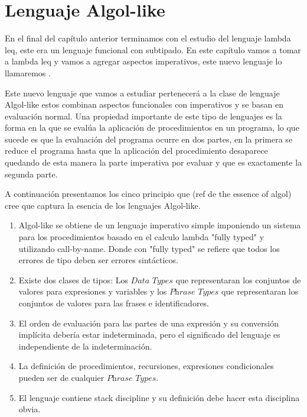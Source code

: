 \chapter{Lenguaje Algol-like}
\label{chap:algollike}

En el final del cap\'itulo anterior terminamos con el estudio
del lenguaje lambda leq, este era un lenguaje funcional con subtipado.
En este cap\'itulo vamos a tomar a lambda leq y vamos a agregar
aspectos imperativos, este nuevo lenguaje lo llamaremos \Alike.

Este nuevo lenguaje que vamos a estudiar pertenecer\'a a la clase
de lenguaje Algol-like estos combinan
aspectos funcionales con imperativos y se basan en evaluaci\'on
normal. Una propiedad importante de este tipo de lenguajes es
la forma en la que se eval\'ua la aplicaci\'on de procedimientos
en un programa, lo que sucede es que la evaluaci\'on del programa
ocurre en dos partes, en la primera se reduce el programa hasta que
la aplicaci\'on del procedimiento desaparece quedando de esta manera 
la parte imperativa por evaluar y que es exactamente la segunda parte.

A continuaci\'on presentamos los cinco principio que (ref de the essence of algol)
cree que captura la esencia de los lenguajes Algol-like.

\begin{enumerate}
\item Algol-like se obtiene de un lenguaje imperativo simple imponiendo un
sistema para los procedimientos basado en el calculo lambda "fully typed" y utilizando
call-by-name. Donde con "fully typed" se refiere que todos los errores de tipo deben ser
errores sint\'acticos.

\item Existe dos clases de tipos: Los $\textit{Data Types}$ que representaran los 
conjuntos de valores para expresiones y variables y los $\textit{Phrase Types}$ que
representaran los conjuntos de valores para las frases e identificadores.

\item El orden de evaluaci\'on para las partes de una expresi\'on y su
conversi\'on impl\'icita deber\'ia estar indeterminada, pero el significado
del lenguaje es independiente de la indeterminaci\'on.

\item La definici\'on de procedimientos, recursiones, expresiones condicionales
pueden ser de cualquier $\textit{Phrase Types}$.

\item El lenguaje contiene stack discipline y su definici\'on debe hacer esta disciplina
obvia.

\end{enumerate}

